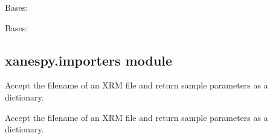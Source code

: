 \documentclass[letterpaper,10pt,english]{sphinxmanual}
\begin{document}

\begin{fulllineitems}
\label{\detokenize{xanespy:xanespy.exceptions.RefinementError}}
Bases: 

\end{fulllineitems}


\begin{fulllineitems}
\label{\detokenize{xanespy:xanespy.exceptions.XanesMathError}}
Bases: 

\end{fulllineitems}



\subsection{xanespy.importers module}
\label{\detokenize{xanespy:module-xanespy.importers}}\label{\detokenize{xanespy:xanespy-importers-module}}

\begin{fulllineitems}
\label{\detokenize{xanespy:xanespy.importers.decode_aps_params}}
Accept the filename of an XRM file and return sample parameters as
a dictionary.

\end{fulllineitems}


\begin{fulllineitems}
\label{\detokenize{xanespy:xanespy.importers.decode_ssrl_params}}
Accept the filename of an XRM file and return sample parameters as
a dictionary.

\end{fulllineitems}


\begin{fulllineitems}
\label{\detokenize{xanespy:xanespy.importers.import_aps_8BM_frameset}}
\end{fulllineitems}
\end{document}
